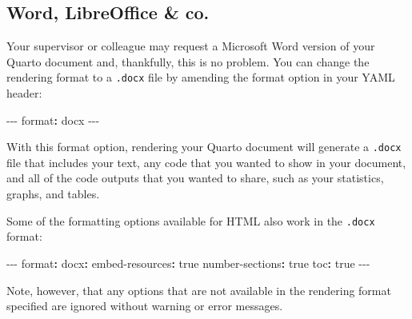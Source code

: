 \documentclass[
  letterpaper,
  DIV=11,
  numbers=noendperiod]{scrreprt}
\newenvironment{Shaded}{\begin{snugshade}}{\end{snugshade}}
\newcommand{\AttributeTok}[1]{\textcolor[rgb]{0.40,0.45,0.13}{#1}}
\newcommand{\CharTok}[1]{\textcolor[rgb]{0.13,0.47,0.30}{#1}}
\newcommand{\FunctionTok}[1]{\textcolor[rgb]{0.28,0.35,0.67}{#1}}
\newcommand{\KeywordTok}[1]{\textcolor[rgb]{0.00,0.23,0.31}{\textbf{#1}}}
\newcommand{\PreprocessorTok}[1]{\textcolor[rgb]{0.68,0.00,0.00}{#1}}
\begin{document}
\subsection{Word, LibreOffice \& co.}\label{sec-Word}

Your supervisor or colleague may request a Microsoft Word version of
your Quarto document and, thankfully, this is no problem. You can change
the rendering format to a \texttt{.docx} file by amending the format
option in your YAML header:

\begin{Shaded}
\begin{Highlighting}[]
\PreprocessorTok{{-}{-}{-}}
\FunctionTok{format}\KeywordTok{:}\AttributeTok{ docx}
\PreprocessorTok{{-}{-}{-}}
\end{Highlighting}
\end{Shaded}

With this format option, rendering your Quarto document will generate a
\texttt{.docx} file that includes your text, any code that you wanted to
show in your document, and all of the code outputs that you wanted to
share, such as your statistics, graphs, and tables.

Some of the formatting options available for HTML also work in the
\texttt{.docx} format:

\begin{Shaded}
\begin{Highlighting}[]
\PreprocessorTok{{-}{-}{-}}
\FunctionTok{format}\KeywordTok{:}
\AttributeTok{  }\FunctionTok{docx}\KeywordTok{:}
\AttributeTok{    }\FunctionTok{embed{-}resources}\KeywordTok{:}\AttributeTok{ }\CharTok{true}
\AttributeTok{    }\FunctionTok{number{-}sections}\KeywordTok{:}\AttributeTok{ }\CharTok{true}
\AttributeTok{    }\FunctionTok{toc}\KeywordTok{:}\AttributeTok{ }\CharTok{true}
\PreprocessorTok{{-}{-}{-}}
\end{Highlighting}
\end{Shaded}

Note, however, that any options that are not available in the rendering
format specified are ignored without warning or error messages.
\end{document}
